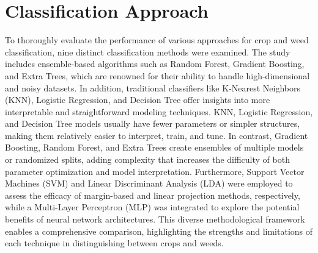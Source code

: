 \documentclass[letterpaper, notitlepage]{report}
\begin{document}
\section{Classification Approach}
%
To thoroughly evaluate the performance of various approaches for crop and weed classification, nine distinct classification methods were examined. The study includes ensemble-based algorithms such as Random Forest, Gradient Boosting, and Extra Trees, which are renowned for their ability to handle high-dimensional and noisy datasets. In addition, traditional classifiers like K-Nearest Neighbors (KNN), Logistic Regression, and Decision Tree offer insights into more interpretable and straightforward modeling techniques. KNN, Logistic Regression, and Decision Tree models usually have fewer parameters or simpler structures, making them relatively easier to interpret, train, and tune. In contrast, Gradient Boosting, Random Forest, and Extra Trees create ensembles of multiple models or randomized splits, adding complexity that increases the difficulty of both parameter optimization and model interpretation. Furthermore, Support Vector Machines (SVM) and Linear Discriminant Analysis (LDA) were employed to assess the efficacy of margin-based and linear projection methods, respectively, while a Multi-Layer Perceptron (\gls{MLP}) was integrated to explore the potential benefits of neural network architectures. This diverse methodological framework enables a comprehensive comparison, highlighting the strengths and limitations of each technique in distinguishing between crops and weeds.
\end{document}
